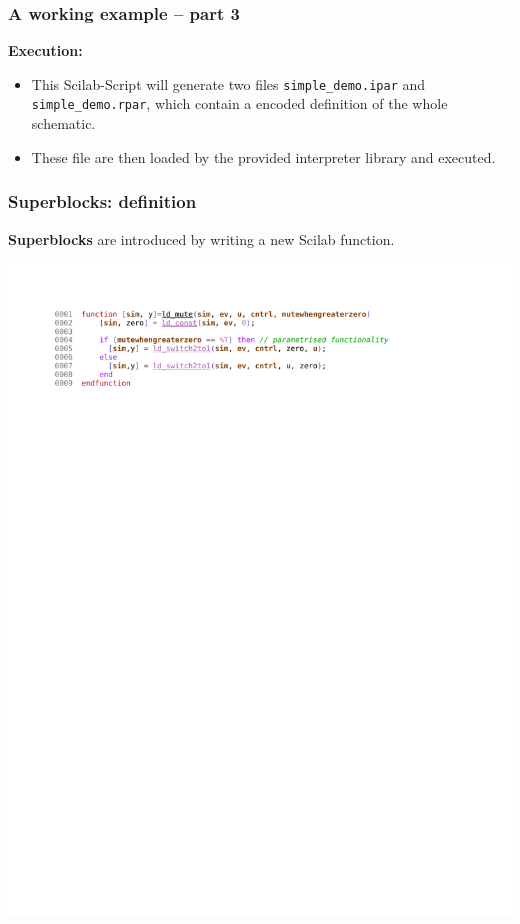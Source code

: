 \documentclass[serif,9pt,xcolor=dvipsnames]{beamer}
\begin{document}
\begin{frame}[fragile]
  \frametitle{A working example -- part 3}

 \textbf{Execution:}
 \begin{itemize}
  \item This Scilab-Script will generate two files \texttt{simple\_demo.ipar} and \texttt{simple\_demo.rpar}, which contain a encoded definition of the whole schematic.
\item These file are then loaded by the provided interpreter library and executed.
 \end{itemize}

\end{frame}


\begin{frame}[fragile]
 \frametitle{Superblocks: definition}
 
\textbf{Superblocks} are introduced by writing a new Scilab function.

\centering \includegraphics[trim=3cm 22cm 4cm 1.4cm, clip, width=0.85\linewidth]{figures/ld_mute.pdf} 



\end{frame}
\end{document}
